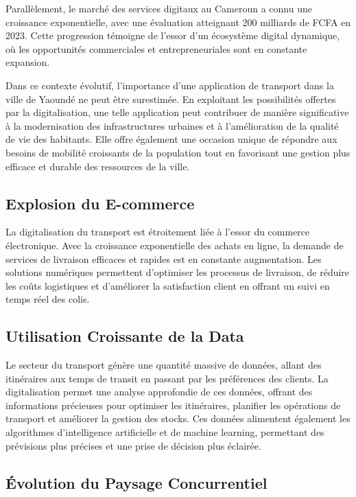 \documentclass{article}
\begin{document}
Parallèlement, le marché des services digitaux au Cameroun a connu une croissance exponentielle, avec une évaluation atteignant 200 milliards de FCFA en 2023. Cette progression témoigne de l'essor d'un écosystème digital dynamique, où les opportunités commerciales et entrepreneuriales sont en constante expansion.

Dans ce contexte évolutif, l'importance d'une application de transport dans la ville de Yaoundé ne peut être surestimée. En exploitant les possibilités offertes par la digitalisation, une telle application peut contribuer de manière significative à la modernisation des infrastructures urbaines et à l'amélioration de la qualité de vie des habitants. Elle offre également une occasion unique de répondre aux besoins de mobilité croissants de la population tout en favorisant une gestion plus efficace et durable des ressources de la ville.
\subsection{Explosion du E-commerce}

La digitalisation du transport est étroitement liée à l'essor du commerce électronique. Avec la croissance exponentielle des achats en ligne, la demande de services de livraison efficaces et rapides est en constante augmentation. Les solutions numériques permettent d'optimiser les processus de livraison, de réduire les coûts logistiques et d'améliorer la satisfaction client en offrant un suivi en temps réel des colis.

\subsection{Utilisation Croissante de la Data}

Le secteur du transport génère une quantité massive de données, allant des itinéraires aux temps de transit en passant par les préférences des clients. La digitalisation permet une analyse approfondie de ces données, offrant des informations précieuses pour optimiser les itinéraires, planifier les opérations de transport et améliorer la gestion des stocks. Ces données alimentent également les algorithmes d'intelligence artificielle et de machine learning, permettant des prévisions plus précises et une prise de décision plus éclairée.

\subsection{Évolution du Paysage Concurrentiel}
\end{document}
